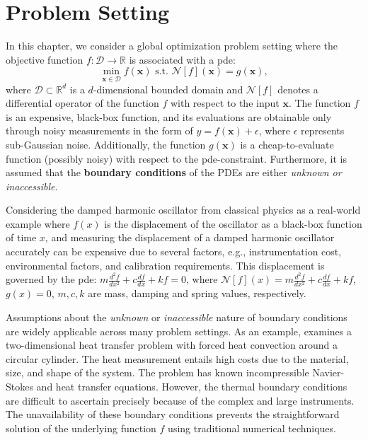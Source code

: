 \section{Problem Setting}
\label{section:pinn-bo_problem_setting}
In this chapter, we consider a global optimization problem setting where the objective function $f \colon \mathcal{D} \rightarrow \mathbb{R}$ is associated with a \ac{pde}:   
\begin{equation*}
        \underset{\mathbf{x} \in \mathcal{D}}{\min} f(\mathbf{x}) \text{ s.t. }  \mathcal{N}[f](\mathbf{x}) = g(\mathbf{x}),
\end{equation*} 
where $\mathcal{D} \subset \mathbb{R}^d$ is a $d$-dimensional bounded domain and $\mathcal{N}[f]$ denotes a differential operator of the function $f$ with respect to the input $\mathbf{x}$. The function $f$ is an expensive, black-box function, and its evaluations are obtainable only through noisy measurements in the form of $y = f(\mathbf{x}) + \epsilon$, where $\epsilon$ represents sub-Gaussian noise. Additionally, the function $g(\mathbf{x})$ is a cheap-to-evaluate function (possibly noisy) with respect to the \ac{pde}-constraint. Furthermore, it is assumed that the \textbf{boundary conditions} of the PDEs are either \textit{unknown or inaccessible}.
\begin{remark}
    Considering the damped harmonic oscillator from classical physics as a real-world example where $f(x)$ is the displacement of the oscillator as a black-box function of time $x$, and measuring the displacement of a damped harmonic oscillator accurately can be expensive due to several factors, e.g., instrumentation cost, environmental factors, and calibration requirements. This displacement is governed by the \ac{pde}: $m \frac{d^2f}{dx^2} + c \frac{df}{dx} + kf = 0$, where $\mathcal{N}[f](x) = m \frac{d^2f}{dx^2} + c \frac{df}{dx} + kf$, $g(x)=0$, $m, c, k$ are mass, damping and spring values, respectively. 
\end{remark}
\begin{remark}
    Assumptions about the \textit{unknown} or \textit{inaccessible} nature of boundary conditions are widely applicable across many problem settings. As an example, \citet{cai2020heat} examines a two-dimensional heat transfer problem with forced heat convection around a circular cylinder. The heat measurement entails high costs due to the material, size, and shape of the system. The problem has known incompressible Navier-Stokes and heat transfer equations. However, the thermal boundary conditions are difficult to ascertain precisely because of the complex and large instruments. The unavailability of these boundary conditions prevents the straightforward solution of the underlying function $f$ using traditional numerical techniques.
\end{remark}


